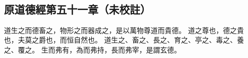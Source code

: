 ﻿%
%

\chapter{~}

\section{原道德經第五十一章（未校註）}

\begin{withgezhu}

\zhsong


道生之而德畜之，物形之而器成之，是以萬物尊道而貴德。
道之尊也，德之貴也，夫莫之爵也，而恒自然也。
道生之、畜之、長之、育之、亭之、毒之、養之、覆之。
生而弗有，為而弗持，長而弗宰，是謂玄德。

\end{withgezhu}

